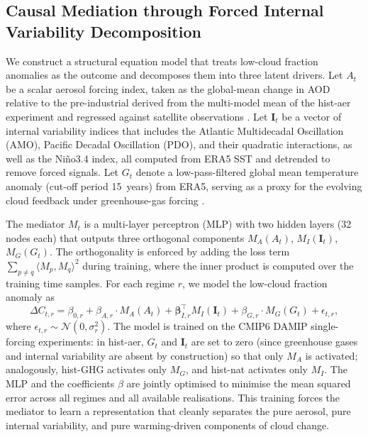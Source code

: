 \documentclass{article}
\begin{document}
\subsection{Causal Mediation through Forced Internal Variability Decomposition}
\label{sec:fivd}
We construct a structural equation model that treats low-cloud fraction anomalies as the outcome and decomposes them into three latent drivers. Let $A_t$ be a scalar aerosol forcing index, taken as the global-mean change in AOD relative to the pre-industrial derived from the multi-model mean of the hist-aer experiment and regressed against satellite observations \cite{gryspeerdt2021}. Let $\mathbf{I}_t$ be a vector of internal variability indices that includes the Atlantic Multidecadal Oscillation (AMO), Pacific Decadal Oscillation (PDO), and their quadratic interactions, as well as the Niño3.4 index, all computed from ERA5 SST and detrended to remove forced signals. Let $G_t$ denote a low-pass-filtered global mean temperature anomaly (cut-off period 15~years) from ERA5, serving as a proxy for the evolving cloud feedback under greenhouse-gas forcing \cite{zelinka2020}.

The mediator $M_t$ is a multi-layer perceptron (MLP) with two hidden layers (32 nodes each) that outputs three orthogonal components $M_{A}(A_t)$, $M_{I}(\mathbf{I}_t)$, $M_{G}(G_t)$. The orthogonality is enforced by adding the loss term $\sum_{p\neq q} \langle M_p, M_q \rangle^2$ during training, where the inner product is computed over the training time samples. For each regime $r$, we model the low-cloud fraction anomaly as
\begin{equation}
\Delta C_{t,r} = \beta_{0,r} + \beta_{A,r} \cdot M_{A}(A_t) + \boldsymbol{\beta}_{I,r}^{\top} M_{I}(\mathbf{I}_t) + \beta_{G,r} \cdot M_{G}(G_t) + \epsilon_{t,r},
\label{eq:mediation}
\end{equation}
where $\epsilon_{t,r} \sim \mathcal{N}(0,\sigma_r^2)$. The model is trained on the CMIP6 DAMIP single-forcing experiments: in hist-aer, $G_t$ and $\mathbf{I}_t$ are set to zero (since greenhouse gases and internal variability are absent by construction) so that only $M_A$ is activated; analogously, hist-GHG activates only $M_G$, and hist-nat activates only $M_I$. The MLP and the coefficients $\beta$ are jointly optimised to minimise the mean squared error across all regimes and all available realisations. This training forces the mediator to learn a representation that cleanly separates the pure aerosol, pure internal variability, and pure warming-driven components of cloud change.
\end{document}
